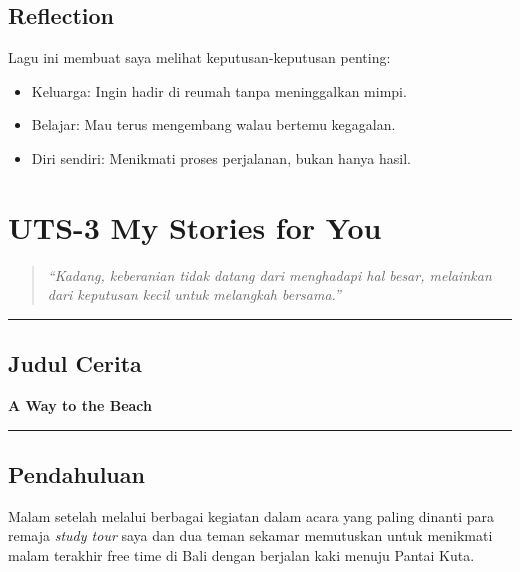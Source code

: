 \documentclass[
  letterpaper,
  DIV=11,
  numbers=noendperiod]{scrreprt}
\providecommand{\tightlist}{%
  \setlength{\itemsep}{0pt}\setlength{\parskip}{0pt}}
\begin{document}
\section{Reflection}\label{reflection}

Lagu ini membuat saya melihat keputusan-keputusan penting:

\begin{itemize}
\tightlist
\item
  Keluarga: Ingin hadir di reumah tanpa meninggalkan mimpi.
\item
  Belajar: Mau terus mengembang walau bertemu kegagalan.
\item
  Diri sendiri: Menikmati proses perjalanan, bukan hanya hasil.
\end{itemize}


\chapter{UTS-3 My Stories for You}\label{uts-3-my-stories-for-you}

\begin{quote}
\emph{``Kadang, keberanian tidak datang dari menghadapi hal besar,
melainkan dari keputusan kecil untuk melangkah bersama.''}
\end{quote}

\begin{center}\rule{0.5\linewidth}{0.5pt}\end{center}

\section{Judul Cerita}\label{judul-cerita}

\textbf{A Way to the Beach}

\begin{center}\rule{0.5\linewidth}{0.5pt}\end{center}

\section{Pendahuluan}\label{pendahuluan}

Malam setelah melalui berbagai kegiatan dalam acara yang paling dinanti
para remaja \emph{study tour} saya dan dua teman sekamar memutuskan
untuk menikmati malam terakhir free time di Bali dengan berjalan kaki
menuju Pantai Kuta.
\end{document}

